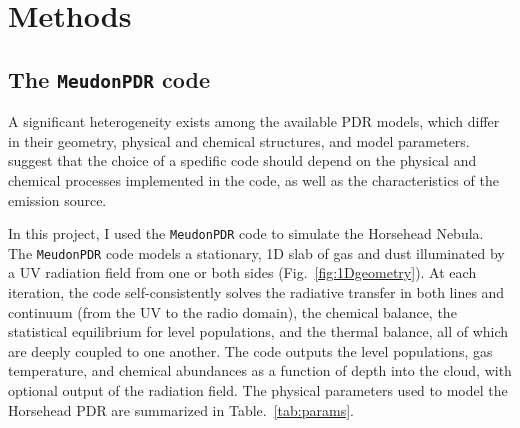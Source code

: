 \documentclass[12pt,a4paper]{article}
\newcommand{\mdpdr}{\texttt{MeudonPDR} code}
\begin{document}
\section{Methods} \label{sec:methods}
\subsection{The \mdpdr{}} \label{sec:mdpdr}
A significant heterogeneity exists among the available PDR models, which differ in their geometry, physical and chemical structures, and model parameters. \textcite{Röllig2007} suggest that the choice of a spedific code should depend on the physical and chemical processes implemented in the code, as well as the characteristics of the emission source. 

In this project, I used the \mdpdr{} \parencite{LePetit2006,Goicoechea2007,Gonzalez2008,LeBourlot2012,Bron_thesis,Bron2014,Bron2016} to simulate the Horsehead Nebula. The \mdpdr{} models a stationary, 1D slab of gas and dust illuminated by a UV radiation field from one or both sides (Fig.~\ref{fig:1Dgeometry}). At each iteration, the code self-consistently solves the radiative transfer in both lines and continuum (from the UV to the radio domain), the chemical balance, the statistical equilibrium for level populations, and the thermal balance, all of which are deeply coupled to one another. The code outputs the level populations, gas temperature, and chemical abundances as a function of depth into the cloud, with optional output of the radiation field. The physical parameters used to model the Horsehead PDR are summarized in Table.~\ref{tab:params}.
\end{document}
